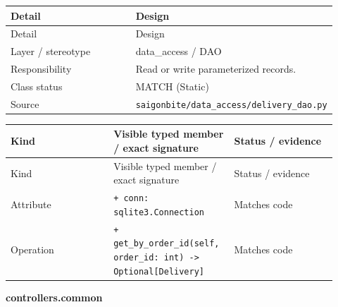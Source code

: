 \begin{longtable}{>{\raggedright\arraybackslash}p{0.4600\linewidth}>{\raggedright\arraybackslash}p{0.4600\linewidth}}
Detail & Design \\
\hline\endfirsthead
Detail & Design \\
\hline\endhead
Layer / stereotype & data\_access / \guillemotleft{}DAO\guillemotright{} \\
Responsibility & Read or write parameterized records. \\
Class status & MATCH (Static) \\
Source & \texttt{saigonbite/\allowbreak{}data\_\allowbreak{}access/\allowbreak{}delivery\_\allowbreak{}dao.\allowbreak{}py} \\
\end{longtable}
\begin{longtable}{>{\raggedright\arraybackslash}p{0.3067\linewidth}>{\raggedright\arraybackslash}p{0.3067\linewidth}>{\raggedright\arraybackslash}p{0.3067\linewidth}}
Kind & Visible typed member / exact signature & Status / evidence \\
\hline\endfirsthead
Kind & Visible typed member / exact signature & Status / evidence \\
\hline\endhead
Attribute & \texttt{+ conn: sqlite3.\allowbreak{}Connection} & Matches code \\
Operation & \texttt{+ get\_\allowbreak{}by\_\allowbreak{}order\_\allowbreak{}id(self, order\_\allowbreak{}id: int) -\textgreater{} Optional[Delivery]} & Matches code \\
\end{longtable}
\textbf{controllers.common}

